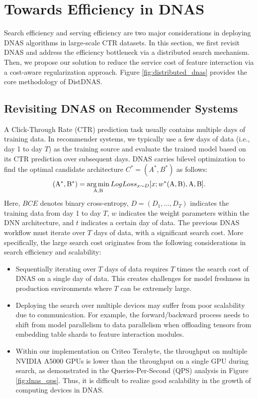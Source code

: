 \section{Towards Efficiency in DNAS}
Search efficiency and serving efficiency are two major considerations in deploying DNAS algorithms in large-scale CTR datasets.
In this section, we first revisit DNAS and address the efficiency bottleneck via a distributed search mechanism. Then, we propose our solution to reduce the service cost of feature interaction via a cost-aware regularization approach. 
Figure \ref{fig:distributed_dnas} provides the core methodology of DistDNAS.

\label{sec4:dist}
\subsection{Revisiting DNAS on Recommender Systems}
A Click-Through Rate (CTR) prediction task usually contains multiple days of training data. In recommender systems, we typically use a few days of data (i.e., day 1 to day $T$) as the training source and evaluate the trained model based on its CTR prediction over subsequent days. DNAS carries bilevel optimization to find the optimal candidate architecture $C^{*}=(A^{*}, B^{*})$ as follows:
\begin{equation}
    (\mathrm{A}^{*}, \mathrm{B}^{*}) = \operatorname*{arg\,min}_{\mathrm{A}, \mathrm{B}} LogLoss_{x \sim D}[x; w^{*}(\mathrm{A}, \mathrm{B}), \mathrm{A}, \mathrm{B}].
\end{equation}
Here, $BCE$ denotes binary cross-entropy, $D=(D_1, ..., D_{T})$ indicates the training data from day 1 to day $T$, $w$ indicates the weight parameters within the DNN architecture, and $t$ indicates a certain day of data. 
The previous DNAS workflow must iterate over $T$ days of data, with a significant search cost. More specifically, the large search cost originates from the following considerations in search efficiency and scalability:
\begin{itemize}[noitemsep,leftmargin=*]
    \item Sequentially iterating over $T$ days of data requires $T$ times the search cost of DNAS on a single day of data. This creates challenges for model freshness in production environments where $T$ can be extremely large. 
    \item Deploying the search over multiple devices may suffer from poor scalability due to communication. For example, the forward/backward process needs to shift from model parallelism to data parallelism when offloading tensors from embedding table shards to feature interaction modules.
    \item Within our implementation on Criteo Terabyte, the throughput on multiple NVIDIA A5000 GPUs is lower than the throughput on a single GPU during search, as demonstrated in the Queries-Per-Second (QPS) analysis in Figure \ref{fig:dnas_qps}. 
    Thus, it is difficult to realize good scalability in the growth of computing devices in DNAS.
\end{itemize}
